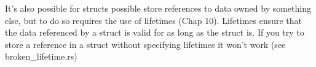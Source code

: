 It’s also possible for structs possible store references to data owned by something else, 
but to do so requires the use of lifetimes (Chap 10). 
Lifetimes ensure that the data referenced by a struct is valid for as long as the struct is.
If you try to store a reference in a struct without specifying lifetimes it won’t work (see broken_lifetime.rs)